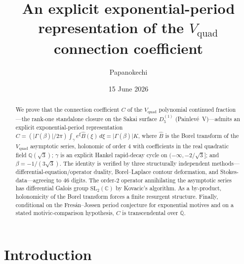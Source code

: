 \documentclass[11pt,reqno]{amsart}
\title[An exponential-period representation of the $V_{\mathrm{quad}}$ constant]%
{An explicit exponential-period representation of the $V_{\mathrm{quad}}$ connection coefficient}
\author{Papanokechi}
\date{15 June 2026}
\theoremstyle{plain}
\theoremstyle{definition}
\newcommand{\Vquad}{V_{\mathrm{quad}}}
\newcommand{\Bhat}{\widehat{B}}
\newcommand{\Qsqrt}{\mathbb{Q}(\sqrt3)}
\newcommand{\Qbar}{\overline{\mathbb{Q}}}
\newcommand{\SL}{\mathrm{SL}}
\begin{document}
\begin{abstract}
We prove that the connection coefficient $C$ of the $\Vquad$ polynomial continued fraction---the
rank-one standalone closure on the Sakai surface $D_5^{(1)}$ (Painlev\'e~V)---admits an explicit
exponential-period representation
$C=(\lvert\Gamma(\beta)\rvert/2\pi)\int_\gamma e^{\xi}\Bhat(\xi)\,d\xi=\lvert\Gamma(\beta)\rvert K$,
where $\Bhat$ is the Borel transform of the $\Vquad$ asymptotic series, holonomic of order $4$
with coefficients in the real quadratic field $\Qsqrt$; $\gamma$ is an explicit Hankel
rapid-decay cycle on $(-\infty,-2/\sqrt3]$; and $\beta=-1/(3\sqrt3)$. The identity is verified by
three structurally independent methods---differential-equation/operator duality, Borel--Laplace
contour deformation, and Stokes-data---agreeing to $46$ digits. The order-$2$ operator annihilating
the asymptotic series has differential Galois group $\SL_2(\mathbb{C})$ by Kovacic's algorithm.
As a by-product, holonomicity of the Borel transform forces a finite resurgent structure. Finally,
conditional on the Fres\'an--Jossen period conjecture for exponential motives and on a stated
motivic-comparison hypothesis, $C$ is transcendental over $\Qbar$.
\end{abstract}
\maketitle

\section{Introduction}\label{sec:intro}
\end{document}
